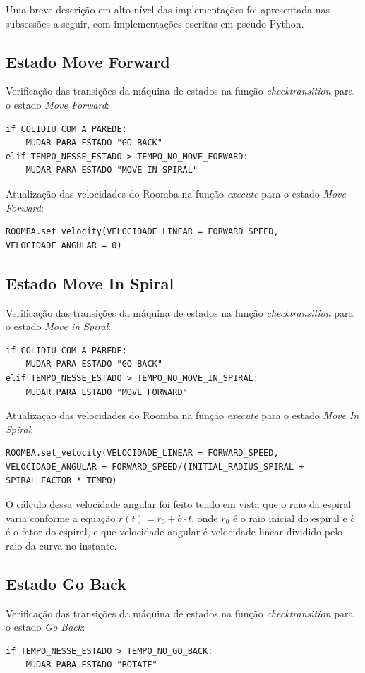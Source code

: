 \documentclass[conference]{IEEEtran}
\begin{document}
Uma breve descrição em alto nível das implementações foi apresentada nas subsessões a seguir, com implementações escritas em pseudo-Python.

\subsection{Estado Move Forward}
Verificação das transições da máquina de estados na função \textit{check\underline{\space}transition} para o estado \textit{Move Forward}:
\begin{lstlisting}
if COLIDIU COM A PAREDE:
	MUDAR PARA ESTADO "GO BACK"
elif TEMPO_NESSE_ESTADO > TEMPO_NO_MOVE_FORWARD:
	MUDAR PARA ESTADO "MOVE IN SPIRAL"
\end{lstlisting}

Atualização das velocidades do Roomba na função \textit{execute} para o estado \textit{Move Forward}:
\begin{lstlisting}
ROOMBA.set_velocity(VELOCIDADE_LINEAR = FORWARD_SPEED, VELOCIDADE_ANGULAR = 0)
\end{lstlisting}

\subsection{Estado Move In Spiral}
Verificação das transições da máquina de estados na função \textit{check\underline{\space}transition} para o estado \textit{Move in Spiral}:
\begin{lstlisting}
if COLIDIU COM A PAREDE:
	MUDAR PARA ESTADO "GO BACK"
elif TEMPO_NESSE_ESTADO > TEMPO_NO_MOVE_IN_SPIRAL:
	MUDAR PARA ESTADO "MOVE FORWARD"
\end{lstlisting}

Atualização das velocidades do Roomba na função \textit{execute} para o estado \textit{Move In Spiral}:
\begin{lstlisting}
ROOMBA.set_velocity(VELOCIDADE_LINEAR = FORWARD_SPEED, VELOCIDADE_ANGULAR = FORWARD_SPEED/(INITIAL_RADIUS_SPIRAL + SPIRAL_FACTOR * TEMPO)
\end{lstlisting}

O cálculo dessa velocidade angular foi feito tendo em vista que o raio da espiral varia conforme a equação $r(t) = r_0 + b \cdot t$, onde $r_0$ é o raio inicial do espiral e $b$ é o fator do espiral, e que velocidade angular é velocidade linear dividido pelo raio da curva no instante.

\subsection{Estado Go Back}
Verificação das transições da máquina de estados na função \textit{check\underline{\space}transition} para o estado \textit{Go Back}:
\begin{lstlisting}
if TEMPO_NESSE_ESTADO > TEMPO_NO_GO_BACK:
	MUDAR PARA ESTADO "ROTATE"
\end{lstlisting}
\end{document}

